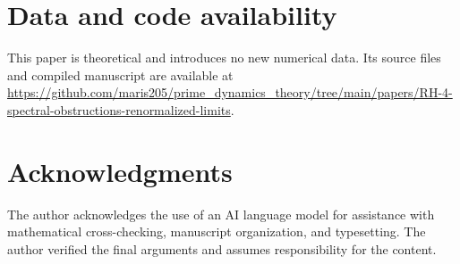\documentclass[11pt]{article}
\theoremstyle{definition}
\theoremstyle{remark}
\begin{document}
\section*{Data and code availability}

This paper is theoretical and introduces no new numerical data.  Its source files and compiled manuscript are available at
\url{https://github.com/maris205/prime_dynamics_theory/tree/main/papers/RH-4-spectral-obstructions-renormalized-limits}.

\section*{Acknowledgments}

The author acknowledges the use of an AI language model for assistance with mathematical cross-checking, manuscript organization, and typesetting.  The author verified the final arguments and assumes responsibility for the content.

{\small


}
\end{document}
